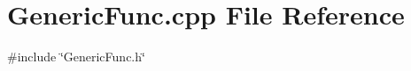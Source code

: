 \section{Generic\+Func.\+cpp File Reference}
\label{_generic_func_8cpp}
{\ttfamily \#include \char`\"{}Generic\+Func.\+h\char`\"{}}\newline
